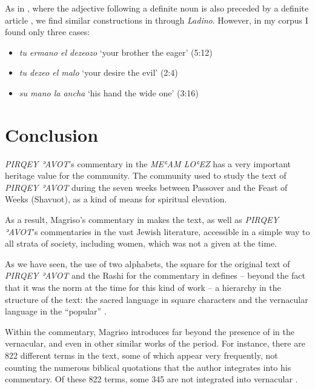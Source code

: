 \documentclass[output=paper,colorlinks,citecolor=brown,babel,arabicfont]{langscibook}
\begin{document}
As in , where the adjective following a definite noun is also preceded by a definite article \citep[252]{bornes-varol2008}, we find similar constructions in  through \textit{Ladino}. However, in my corpus I found only three cases: 

\begin{itemize}
\item \textit{tu ermano el dezeozo} `your brother the eager' (5:12)
\item \textit{tu dezeo el malo} `your desire the evil' (2:4)
\item \textit{su mano la ancha} `his hand the wide one' (3:16)
\end{itemize}

\section{Conclusion}\label{ch3.7.ss.4}

\textit{PIRQEY ʾAVOT}'s commentary in the \textit{MEʿAM LOʿEZ} has a very important heritage value for the  community. The community used to study the text of \textit{PIRQEY ʾAVOT} during the seven weeks between Passover and the Feast of Weeks (Shavuot), as a kind of means for spiritual elevation. 

As a result, Magriso's commentary in  makes the text, as well as \textit{PIRQEY ʾAVOT}'s commentaries in the vast Jewish literature, accessible in a simple way to all strata of  society, including women, which was not a given at the time.  

As we have seen, the use of two  alphabets, the square for the original  text of \textit{PIRQEY ʾAVOT} and the Rashi for the commentary in  defines -- beyond the fact that it was the norm at the time for this kind of work -- a hierarchy in the structure of the text: the sacred language in square characters and the vernacular language in the ``popular'' . 

Within the commentary, Magriso introduces  far beyond the presence of  in the vernacular, and even in other similar works of the period. For instance, there are 822 different  terms in the text, some of which appear very frequently, not counting the numerous biblical quotations that the author integrates into his commentary. Of these 822 terms, some 345 are not integrated into vernacular . 
\end{document}

